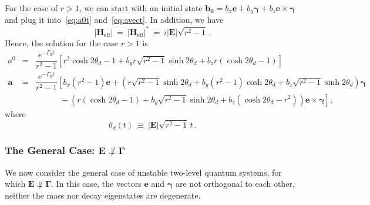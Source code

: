 \documentclass[12pt,a4paper]{article}
\begin{document}
For the case of $r>1$, we can start with an initial state $\mathbf{b_0} = b_x\mathbf{e}+b_y\boldsymbol{\gamma}+b_z\mathbf{e}\times\boldsymbol{\gamma}$ and plug it into~\eqref{eq:a0t} and~\eqref{eq:avect}. In addition, we have
\begin{equation}
    |\mathbf{H}_{\text{eff}}|\: =\: |\mathbf{H}_{\text{eff}}|^*\: =\: i|\mathbf{E}|\sqrt{r^2-1}\,.
\end{equation}
Hence, the solution for the case $r>1$ is
\begin{eqnarray}
        a^0 \!&=&\! \dfrac{e^{-\Gamma_0 t}}{r^2-1}\left[r^2\cosh{2\theta_d}-1+b_yr\sqrt{r^2-1}\sinh{2\theta_d}+b_z r(\cosh{2\theta_d}-1)\right]
        \\[3mm]
        \mathbf{a} \!&=&\! \dfrac{e^{-\Gamma_0 t}}{r^2-1}\left[b_x(r^2-1)\mathbf{e}+\left(r\sqrt{r^2-1}\sinh{2\theta_d}+b_y(r^2-1)\cosh{2\theta_d} + b_z\sqrt{r^2-1}\sinh{2\theta_d}\right)\boldsymbol{\gamma}\right.\nonumber\\
        &&\quad\quad\quad-\left.\left(r(\cosh{2\theta_d}-1)+b_y\sqrt{r^2-1}\sinh{2\theta_d}+b_z(\cosh{2\theta_d}-r^2)\right)\mathbf{e}\times\boldsymbol{\gamma}\right],
\end{eqnarray}
where
\begin{equation}
    \theta_d(t)\: \equiv\: |\mathbf{\mathbf{E}}|\sqrt{r^2-1}\,t\,.
\end{equation}

\subsubsection{The General Case: $\mathbf{E}\not\perp\mathbf{\Gamma}$}

We now consider the general case of unstable two-level quantum systems, for which $\mathbf{E}\not\perp\mathbf{\Gamma}$. In this case,  the vectors $\mathbf{e}$ and $\boldsymbol{\gamma}$ are not orthogonal to each other, neither the mass nor decay eigenstates are degenerate. 
\end{document}
